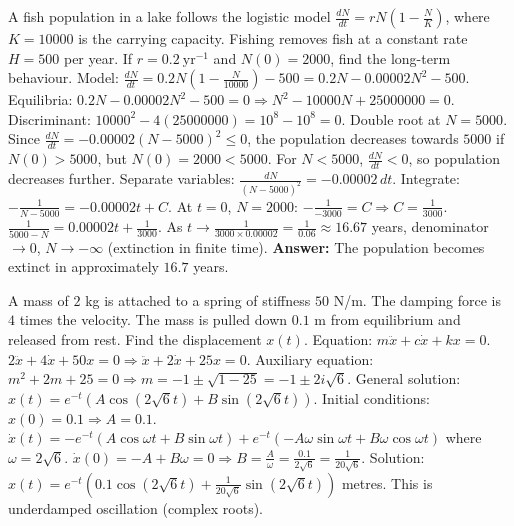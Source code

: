 \documentclass[11pt]{article}
\newcommand{\cle}[1]{{\popxbold\color{popdark}#1}}
\begin{document}
\begin{exoresolu}
A fish population in a lake follows the logistic model $\frac{dN}{dt} = rN(1-\frac{N}{K})$, where $K=10000$ is the carrying capacity. Fishing removes fish at a constant rate $H=500$ per year. If $r=0.2\ \text{yr}^{-1}$ and $N(0)=2000$, find the long-term behaviour.
\tcblower
Model: $\frac{dN}{dt} = 0.2N(1-\frac{N}{10000}) - 500 = 0.2N - 0.00002N^2 - 500$.
Equilibria: $0.2N - 0.00002N^2 - 500 = 0 \Rightarrow N^2 - 10000N + 25000000 = 0$.
Discriminant: $10000^2 - 4(25000000) = 10^8 - 10^8 = 0$.
Double root at $N = 5000$.
Since $\frac{dN}{dt} = -0.00002(N-5000)^2 \le 0$, the population decreases towards $5000$ if $N(0)>5000$, but $N(0)=2000 < 5000$.
For $N<5000$, $\frac{dN}{dt} < 0$, so population decreases further.
Separate variables: $\frac{dN}{(N-5000)^2} = -0.00002\,dt$.
Integrate: $-\frac{1}{N-5000} = -0.00002t + C$.
At $t=0$, $N=2000$: $-\frac{1}{-3000} = C \Rightarrow C = \frac{1}{3000}$.
$\frac{1}{5000-N} = 0.00002t + \frac{1}{3000}$.
As $t \to \frac{1}{3000 \times 0.00002} = \frac{1}{0.06} \approx 16.67$ years, denominator $\to 0$, $N \to -\infty$ (extinction in finite time).
\textbf{Answer:} The population becomes extinct in approximately $16.7$ years.
\end{exoresolu}

\begin{exoresolu}
A mass of $2$ kg is attached to a spring of stiffness $50$ N/m. The damping force is $4$ times the velocity. The mass is pulled down $0.1$ m from equilibrium and released from rest. Find the displacement $x(t)$.
\tcblower
Equation: $m\ddot{x} + c\dot{x} + kx = 0$.
$2\ddot{x} + 4\dot{x} + 50x = 0 \Rightarrow \ddot{x} + 2\dot{x} + 25x = 0$.
Auxiliary equation: $m^2 + 2m + 25 = 0 \Rightarrow m = -1 \pm \sqrt{1-25} = -1 \pm 2i\sqrt{6}$.
General solution: $x(t) = e^{-t}(A\cos(2\sqrt{6}t) + B\sin(2\sqrt{6}t))$.
Initial conditions: $x(0)=0.1 \Rightarrow A=0.1$.
$\dot{x}(t) = -e^{-t}(A\cos\omega t + B\sin\omega t) + e^{-t}(-A\omega\sin\omega t + B\omega\cos\omega t)$ where $\omega=2\sqrt{6}$.
$\dot{x}(0) = -A + B\omega = 0 \Rightarrow B = \frac{A}{\omega} = \frac{0.1}{2\sqrt{6}} = \frac{1}{20\sqrt{6}}$.
Solution: $\boxed{x(t) = e^{-t}\left(0.1\cos(2\sqrt{6}t) + \frac{1}{20\sqrt{6}}\sin(2\sqrt{6}t)\right)}$ metres.
This is \cle{underdamped} oscillation (complex roots).
\end{exoresolu}
\end{document}
